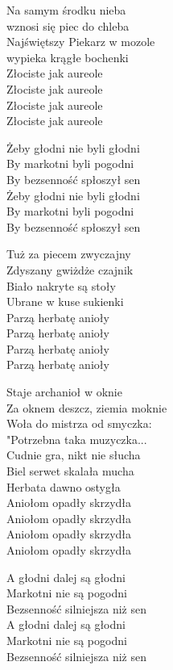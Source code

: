 \begin{text}
    Na samym środku nieba\\
    wznosi się piec do chleba\\
    Najświętszy Piekarz w mozole\\
    wypieka krągłe bochenki\\
    Złociste jak aureole\\
    Złociste jak aureole\\
    Złociste jak aureole\\
    Złociste jak aureole

    \vin Żeby głodni nie byli głodni\\
    \vin By markotni byli pogodni\\
    \vin By bezsenność spłoszył sen\\
    \vin Żeby głodni nie byli głodni\\
    \vin By markotni byli pogodni\\
    \vin By bezsenność spłoszył sen

    Tuż za piecem zwyczajny\\
    Zdyszany gwiżdże czajnik\\
    Biało nakryte są stoły\\
    Ubrane w kuse sukienki\\
    Parzą herbatę anioły\\
    Parzą herbatę anioły\\
    Parzą herbatę anioły\\
    Parzą herbatę anioły

    Staje archanioł w oknie\\
    Za oknem deszcz, ziemia moknie\\
    Woła do mistrza od smyczka:\\
    "Potrzebna taka muzyczka...\\

    Cudnie gra, nikt nie słucha\\
    Biel serwet skalała mucha\\
    Herbata dawno ostygła\\
    Aniołom opadły skrzydła\\
    Aniołom opadły skrzydła\\
    Aniołom opadły skrzydła\\
    Aniołom opadły skrzydła

    A głodni dalej są głodni\\
    Markotni nie są pogodni\\
    Bezsenność silniejsza niż sen\\
    A głodni dalej są głodni\\
    Markotni nie są pogodni\\
    Bezsenność silniejsza niż sen
\end{text}
\begin{chord}

\end{chord}